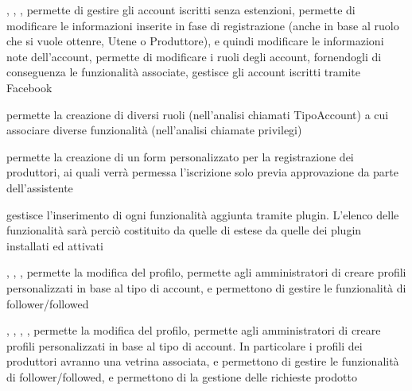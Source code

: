 
{, , , }
{ permette di gestire gli account iscritti senza estenzioni,  permette di modificare le informazioni inserite in fase di registrazione (anche in base al ruolo che si vuole ottenre, Utene o Produttore), e quindi modificare le informazioni note dell'account,  permette di modificare i ruoli degli account, fornendogli di conseguenza le funzionalità associate,  gestisce gli account iscritti tramite Facebook}


{}
{ permette la creazione di diversi ruoli (nell'analisi chiamati TipoAccount) a cui associare diverse funzionalità (nell'analisi chiamate privilegi)}


{}
{ permette la creazione di un form personalizzato per la registrazione dei produttori, ai quali verrà permessa l'iscrizione solo previa approvazione da parte dell'assistente}


{}
{ gestisce l'inserimento di ogni funzionalità aggiunta tramite plugin. L'elenco delle funzionalità sarà perciò costituito da quelle di  estese da quelle dei plugin installati ed attivati}


{, , , }
{ permette la modifica del profilo,  permette agli amministratori di creare profili personalizzati in base al tipo di account,  e  permettono di gestire le funzionalità di follower/followed}


{, , , , }
{ permette la modifica del profilo,  permette agli amministratori di creare profili personalizzati in base al tipo di account. In particolare i profili dei produttori avranno una vetrina associata,  e  permettono di gestire le funzionalità di follower/followed,  e  permettono di la gestione delle richieste prodotto}

